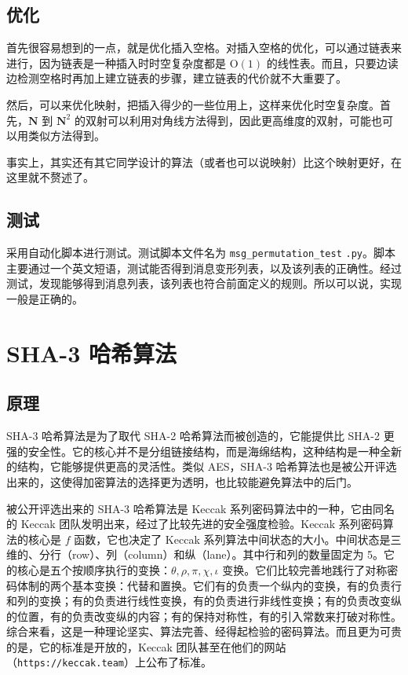 \documentclass[12pt,a4paper]{article}
\begin{document}
\subsection*{优化}

首先很容易想到的一点，就是优化插入空格。对插入空格的优化，可以通过链表来进行，因为链表是一种插入时时空复杂度都是 $ \mathrm{O}(1) $ 的线性表。而且，只要边读边检测空格时再加上建立链表的步骤，建立链表的代价就不大重要了。

然后，可以来优化映射，把插入得少的一些位用上，这样来优化时空复杂度。首先，$ \mathbf{N} $ 到 $ \mathbf{N}^2 $ 的双射可以利用对角线方法得到，因此更高维度的双射，可能也可以用类似方法得到。

事实上，其实还有其它同学设计的算法（或者也可以说映射）比这个映射更好，在这里就不赘述了。

\subsection*{测试}

采用自动化脚本进行测试。测试脚本文件名为 \verb|msg_permutation_test| \verb|.py|。脚本主要通过一个英文短语，测试能否得到消息变形列表，以及该列表的正确性。经过测试，发现能够得到消息列表，该列表也符合前面定义的规则。所以可以说，实现一般是正确的。

\section*{SHA-3 哈希算法}

\subsection*{原理}

SHA-3 哈希算法是为了取代 SHA-2 哈希算法而被创造的，它能提供比 SHA-2 更强的安全性。它的核心并不是分组链接结构，而是海绵结构，这种结构是一种全新的结构，它能够提供更高的灵活性。类似 AES，SHA-3 哈希算法也是被公开评选出来的，这使得加密算法的选择更为透明，也比较能避免算法中的后门。

被公开评选出来的 SHA-3 哈希算法是 Keccak 系列密码算法中的一种，它由同名的 Keccak 团队发明出来，经过了比较先进的安全强度检验。Keccak 系列密码算法的核心是 $ f $ 函数，它也决定了 Keccak 系列算法中间状态的大小。中间状态是三维的、分行（row）、列（column）和纵（lane）。其中行和列的数量固定为 5。它的核心是五个按顺序执行的变换：$ \theta, \rho, \pi, \chi, \iota $ 变换。它们比较完善地践行了对称密码体制的两个基本变换：代替和置换。它们有的负责一个纵内的变换，有的负责行和列的变换；有的负责进行线性变换，有的负责进行非线性变换；有的负责改变纵的位置，有的负责改变纵的内容；有的保持对称性，有的引入常数来打破对称性。综合来看，这是一种理论坚实、算法完善、经得起检验的密码算法。而且更为可贵的是，它的标准是开放的，Keccak 团队甚至在他们的网站（\texttt{https://keccak.team}）上公布了标准。
\end{document}
